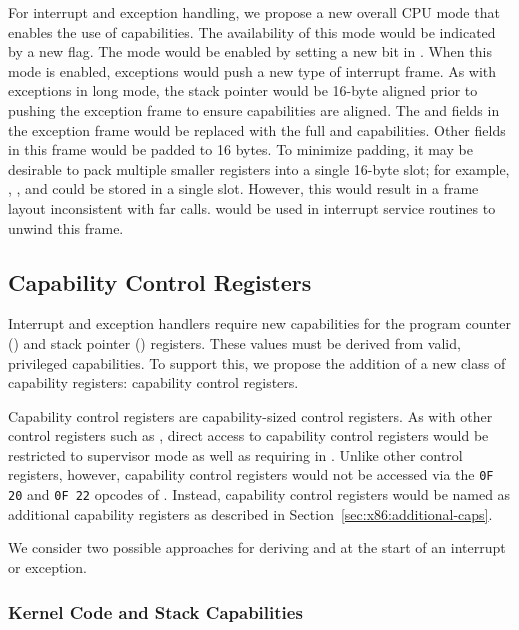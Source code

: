 For interrupt and exception handling, we propose a new overall CPU
mode that enables the use of capabilities.  The availability of this
mode would be indicated by a new  flag.  The mode
would be enabled by setting a new bit in \CRFOUR{}.  When this mode is
enabled, exceptions would push a new type of interrupt frame.  As with
exceptions in long mode, the stack pointer would be 16-byte aligned
prior to pushing the exception frame to ensure capabilities are
aligned.  The \RIP{} and \RSP{} fields in the exception frame would be
replaced with the full \CIP{} and \CSP{} capabilities.  Other fields
in this frame would be padded to 16 bytes.  To minimize padding, it
may be desirable to pack multiple smaller registers into a single
16-byte slot; for example, \SS{}, \CS{}, and \RFLAGS{} could be stored
in a single slot.  However, this would result in a frame layout
inconsistent with far calls.   would be used in
interrupt service routines to unwind this frame.

\subsection{Capability Control Registers}
\label{sec:x86:capability-control-registers}

Interrupt and exception handlers require new capabilities for the
program counter (\CIP{}) and stack pointer (\CSP{}) registers.  These
values must be derived from valid, privileged capabilities.  To
support this, we propose the addition of a new class of capability
registers: capability control registers.

Capability control registers are capability-sized control registers.
As with other control registers such as \CRFOUR, direct access to
capability control registers would be restricted to supervisor mode as
well as requiring \cappermASR{} in \CIP{}.  Unlike other control
registers, however, capability control registers would not be accessed
via the \texttt{0F 20} and \texttt{0F 22} opcodes of .
Instead, capability control registers would be named as additional
capability registers as described in
Section~\ref{sec:x86:additional-caps}.

We consider two possible approaches for deriving \CIP{} and \CSP{} at
the start of an interrupt or exception.

\subsubsection{Kernel Code and Stack Capabilities}

